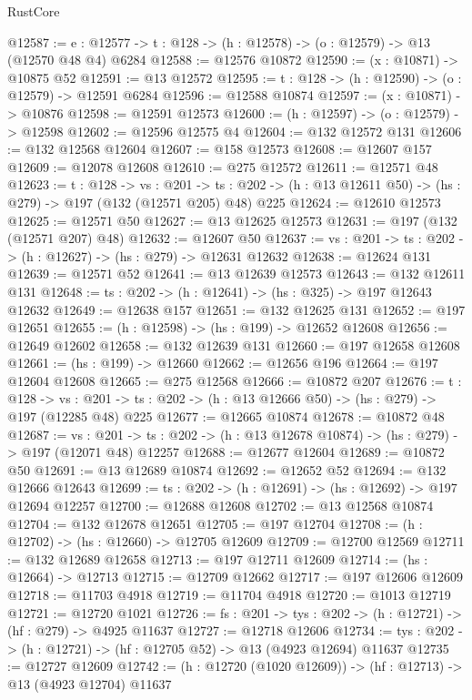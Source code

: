 \begin{lexlean}{RustCore}
\begin{coremodule}
@12587 := {e : @12577} -> {t : @128} -> (h : @12578) -> (o : @12579) -> @13 (@12570 @48 @4) @6284
@12588 := @12576 @10872
@12590 := (x : @10871) -> @10875 @52
@12591 := @13 @12572
@12595 := {t : @128} -> (h : @12590) -> (o : @12579) -> @12591 @6284
@12596 := @12588 @10874
@12597 := (x : @10871) -> @10876
@12598 := @12591 @12573
@12600 := (h : @12597) -> (o : @12579) -> @12598
@12602 := @12596 @12575 @4
@12604 := @132 @12572 @131
@12606 := @132 @12568 @12604
@12607 := @158 @12573
@12608 := @12607 @157
@12609 := @12078 @12608
@12610 := @275 @12572
@12611 := @12571 @48
@12623 := {t : @128} ->
  {vs : @201} ->
  {ts : @202} -> (h : @13 @12611 @50) -> (hs : @279) -> @197 (@132 (@12571 @205) @48) @225
@12624 := @12610 @12573
@12625 := @12571 @50
@12627 := @13 @12625 @12573
@12631 := @197 (@132 (@12571 @207) @48)
@12632 := @12607 @50
@12637 := {vs : @201} -> {ts : @202} -> (h : @12627) -> (hs : @279) -> @12631 @12632
@12638 := @12624 @131
@12639 := @12571 @52
@12641 := @13 @12639 @12573
@12643 := @132 @12611 @131
@12648 := {ts : @202} -> (h : @12641) -> (hs : @325) -> @197 @12643 @12632
@12649 := @12638 @157
@12651 := @132 @12625 @131
@12652 := @197 @12651
@12655 := (h : @12598) -> (hs : @199) -> @12652 @12608
@12656 := @12649 @12602
@12658 := @132 @12639 @131
@12660 := @197 @12658 @12608
@12661 := (hs : @199) -> @12660
@12662 := @12656 @196
@12664 := @197 @12604 @12608
@12665 := @275 @12568
@12666 := @10872 @207
@12676 := {t : @128} ->
  {vs : @201} -> {ts : @202} -> (h : @13 @12666 @50) -> (hs : @279) -> @197 (@12285 @48) @225
@12677 := @12665 @10874
@12678 := @10872 @48
@12687 := {vs : @201} ->
  {ts : @202} -> (h : @13 @12678 @10874) -> (hs : @279) -> @197 (@12071 @48) @12257
@12688 := @12677 @12604
@12689 := @10872 @50
@12691 := @13 @12689 @10874
@12692 := @12652 @52
@12694 := @132 @12666 @12643
@12699 := {ts : @202} -> (h : @12691) -> (hs : @12692) -> @197 @12694 @12257
@12700 := @12688 @12608
@12702 := @13 @12568 @10874
@12704 := @132 @12678 @12651
@12705 := @197 @12704
@12708 := (h : @12702) -> (hs : @12660) -> @12705 @12609
@12709 := @12700 @12569
@12711 := @132 @12689 @12658
@12713 := @197 @12711 @12609
@12714 := (hs : @12664) -> @12713
@12715 := @12709 @12662
@12717 := @197 @12606 @12609
@12718 := @11703 @4918
@12719 := @11704 @4918
@12720 := @1013 @12719
@12721 := @12720 @1021
@12726 := {fs : @201} -> {tys : @202} -> (h : @12721) -> (hf : @279) -> @4925 @11637
@12727 := @12718 @12606
@12734 := {tys : @202} -> (h : @12721) -> (hf : @12705 @52) -> @13 (@4923 @12694) @11637
@12735 := @12727 @12609
@12742 := (h : @12720 (@1020 @12609)) -> (hf : @12713) -> @13 (@4923 @12704) @11637

\end{coremodule}
\end{lexlean}
